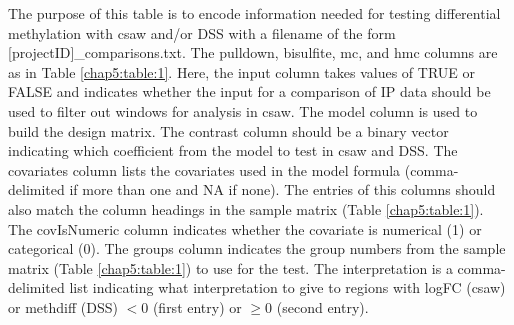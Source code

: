 \begin{sidewaystable}[!ht]
{The purpose of this table is to encode information needed for testing differential methylation with csaw and/or DSS with a filename of the form [projectID]\_comparisons.txt. The pulldown, bisulfite, mc, and hmc columns are as in Table \ref{chap5:table:1}. Here, the input column takes values of TRUE or FALSE and indicates whether the input for a comparison of IP data should be used to filter out windows for analysis in csaw. The model column is used to build the design matrix. The contrast column should be a binary vector indicating which coefficient from the model to test in csaw and DSS. The covariates column lists the covariates used in the model formula (comma-delimited if more than one and NA if none). The entries of this columns should also match the column headings in the sample matrix (Table \ref{chap5:table:1}). The covIsNumeric column indicates whether the covariate is numerical (1) or categorical (0). The groups column indicates the group numbers from the sample matrix (Table \ref{chap5:table:1}) to use for the test. The interpretation is a comma-delimited list indicating what interpretation to give to regions with logFC (csaw) or methdiff (DSS) $< 0$ (first entry) or $\geq 0$ (second entry).
}
\label{chap5:table:2}

\end{sidewaystable}

\newpage

